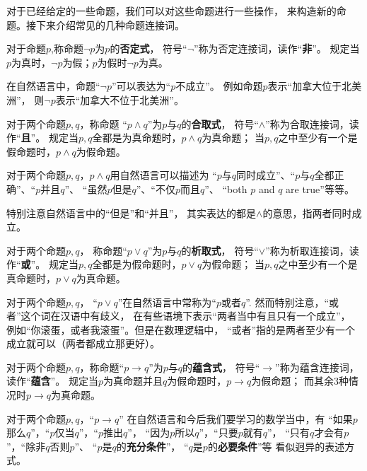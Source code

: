 对于已经给定的一些命题，我们可以对这些命题进行一些操作，
来构造新的命题。接下来介绍常见的几种命题连接词。

\begin{definition}[否定连接词]
对于命题$p$,称命题$\neg p$为$p$的\textbf{否定式}，
符号“$\neg$”称为否定连接词，读作“\textbf{非}”。
规定当$p$为真时，$\neg p$为假；$p$为假时$\neg p$为真。
\end{definition}
在自然语言中，命题“$\neg p$”可以表达为“$p$不成立”。
例如命题$p$表示“加拿大位于北美洲”，
则$\neg p$表示“加拿大不位于北美洲”。

\begin{definition}[合取连接词]
对于两个命题$p,q$，称命题
“$p\wedge q$”为$p$与$q$的\textbf{合取式}，
符号“$\wedge$”称为合取连接词，读作“\textbf{且}”。
规定当$p,q$全都是为真命题时，$p\wedge q$为真命题；
当$p,q$之中至少有一个是假命题时，$p\wedge q$为假命题。
\end{definition}
对于两个命题$p,q$，$p\wedge q$用自然语言可以描述为
“$p$与$q$同时成立”、“$p$与$q$全都正确”、“$p$并且$q$”、
“虽然$p$但是$q$”、“不仅$p$而且$q$”、
“both $p$ and $q$ are true”等等。

特别注意自然语言中的“但是”和“并且”，
其实表达的都是$\wedge$的意思，指两者同时成立。

\begin{definition}[析取连接词]
对于两个命题$p,q$，
称命题“$p\vee q$”为$p$与$q$的\textbf{析取式}，
符号“$\vee$”称为析取连接词，读作“\textbf{或}”。
规定当$p,q$全都是为假命题时，$p\vee q$为假命题；
当$p,q$之中至少有一个是真命题时，$p\vee q$为真命题。
\end{definition}
对于两个命题$p,q$，
“$p\vee q$”在自然语言中常称为“$p$或者$q$”.
然而特别注意，“或者”这个词在汉语中有歧义，
在有些语境下表示“两者当中有且只有一个成立”，
例如“你滚蛋，或者我滚蛋”。但是在数理逻辑中，
“或者”指的是两者至少有一个成立就可以（两者都成立那更好）。

\begin{definition}[蕴含连接词]
对于两个命题$p,q$，称命题“$p\rightarrow q$”为$p$与$q$的\textbf{蕴含式}，
符号“$\rightarrow$”称为蕴含连接词，读作“\textbf{蕴含}”。
规定当$p$为真命题并且$q$为假命题时，$p\rightarrow q$为假命题；
而其余3种情况时$p\rightarrow q$为真命题。
\end{definition}

对于两个命题$p,q$，“$p\rightarrow q$”
在自然语言和今后我们要学习的数学当中，有
“如果$p$那么$q$”，“$p$仅当$q$”，“$p$推出$q$”，
“因为$p$所以$q$”，“只要$p$就有$q$”，
“只有$q$才会有$p$”，“除非$q$否则$p$”、
“$p$是$q$的\textbf{充分条件}”，
“$q$是$p$的\textbf{必要条件}”等
看似迥异的表述方式。

